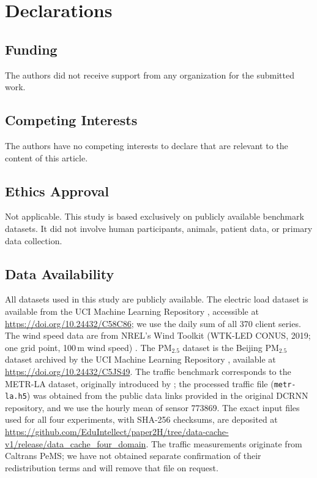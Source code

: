 \documentclass[pdflatex]{sn-jnl}
\begin{document}
\section*{Declarations}

\subsection*{Funding}
The authors did not receive support from any organization for the submitted work.

\subsection*{Competing Interests}
The authors have no competing interests to declare that are relevant to the content of this article.

\subsection*{Ethics Approval}
Not applicable. This study is based exclusively on publicly available benchmark datasets. It did not involve human participants, animals, patient data, or primary data collection.

\subsection*{Data Availability}
All datasets used in this study are publicly available. The electric load dataset is available from the UCI Machine Learning Repository \citep{trindade2015}, accessible at \url{https://doi.org/10.24432/C58C86}; we use the daily sum of all 370 client series. The wind speed data are from NREL's Wind Toolkit (WTK-LED CONUS, 2019; one grid point, 100\,m wind speed) \citep{draxl2015}. The PM$_{2.5}$ dataset is the Beijing PM$_{2.5}$ dataset archived by the UCI Machine Learning Repository \citep{chen2015beijingpm25}, available at \url{https://doi.org/10.24432/C5JS49}. The traffic benchmark corresponds to the METR-LA dataset, originally introduced by \citet{li2018dcrnn}; the processed traffic file (\texttt{metr-la.h5}) was obtained from the public data links provided in the original DCRNN repository, and we use the hourly mean of sensor 773869. The exact input files used for all four experiments, with SHA-256 checksums, are deposited at \url{https://github.com/EduIntellect/paper2H/tree/data-cache-v1/release/data_cache_four_domain}. The traffic measurements originate from Caltrans PeMS; we have not obtained separate confirmation of their redistribution terms and will remove that file on request.
\end{document}
